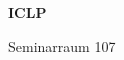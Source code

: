 \documentclass[a4paper]{article}
\begin{document}
\printGenericVSLHeader
\begin{center}
\begin{vsltext}{3cm}{4cm}

   \vspace{0.5cm} 

    \textbf{ICLP} 

    \vspace{1.5cm}

    Seminarraum 107

\end{vsltext}

\end{center}
\end{document}
